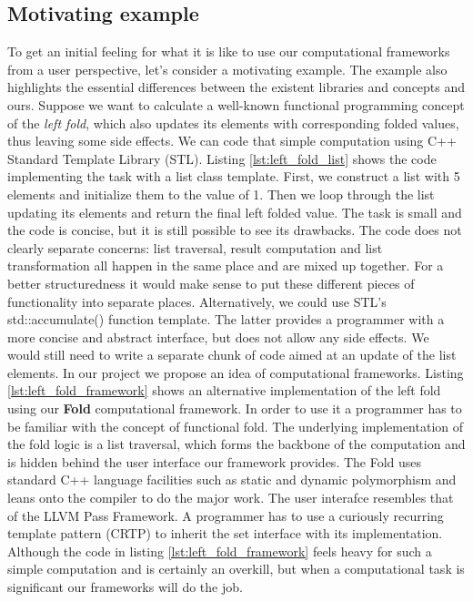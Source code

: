 \subsection{Motivating example}
\label{frameworks_motivating_example}
\quad To get an initial feeling for what it is like to use our computational frameworks from a user perspective, let's consider a motivating example. The example also highlights the essential differences between the existent libraries and concepts and ours.\newline\null
\quad Suppose we want to calculate a well-known functional programming concept of the \textit{left fold}, which also updates its elements with corresponding folded values, thus leaving some side effects. We can code that simple computation using C++ Standard Template Library (STL). Listing \ref{lst:left_fold_list} shows the code implementing the task with a list class template. First, we construct a list with 5 elements and initialize them to the value of 1. Then we loop through the list updating its elements and return the final left folded value. The task is small and the code is concise, but it is still possible to see its drawbacks. The code does not clearly separate concerns: list traversal, result computation and list transformation all happen in the same place and are mixed up together. For a better structuredness it would make sense to put these different pieces of functionality into separate places. Alternatively, we could use STL's std::accumulate() function template. The latter provides a programmer with a more concise and abstract interface, but does not allow any side effects. We would still need to write a separate chunk of code aimed at an update of the list elements.\newline\null 
\quad In our project we propose an idea of computational frameworks. Listing \ref{lst:left_fold_framework} shows an alternative implementation of the left fold using our \textbf{Fold} computational framework. In order to use it a programmer has to be familiar with the concept of functional fold. The underlying implementation of the fold logic is a list traversal, which forms the backbone of the computation and is hidden behind the user interface our framework provides. The Fold uses standard C++ language facilities such as static and dynamic polymorphism and leans onto the compiler to do the major work. The user interafce resembles that of the LLVM Pass Framework. A programmer has to use a curiously recurring template pattern (CRTP) to inherit the set interface with its implementation. Although the code in listing \ref{lst:left_fold_framework} feels heavy for such a simple computation and is certainly an overkill, but when a computational task is significant our frameworks will do the job.

